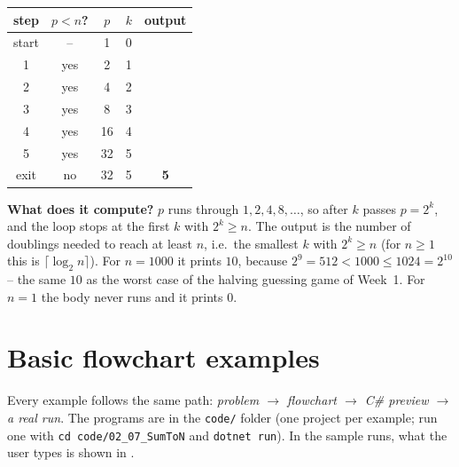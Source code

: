 \documentclass[11pt,a4paper]{article}
\begin{document}
\begin{center}
\begin{minipage}[c]{0.46\linewidth}\centering
{}
\end{minipage}\hfill
\begin{minipage}[c]{0.5\linewidth}\centering\small
\begin{tabular}{ccccc}
\toprule
step & $p<n$? & $p$ & $k$ & output\\ \midrule
start & -- & 1 & 0 & \\
1 & yes & 2 & 1 & \\
2 & yes & 4 & 2 & \\
3 & yes & 8 & 3 & \\
4 & yes & 16 & 4 & \\
5 & yes & 32 & 5 & \\
exit & \textcolor{errc}{no} & 32 & 5 & \textbf{5}\\ \bottomrule
\end{tabular}
\end{minipage}
\end{center}
\textbf{What does it compute?} $p$ runs through $1, 2, 4, 8, \dots$, so after $k$ passes $p = 2^k$, and the loop stops at the first $k$ with $2^k \ge n$. The output is the number of doublings needed to reach at least $n$, i.e.\ the smallest $k$ with $2^k \ge n$ (for $n \ge 1$ this is $\lceil \log_2 n \rceil$). For $n = 1000$ it prints $10$, because $2^9 = 512 < 1000 \le 1024 = 2^{10}$ -- the same $10$ as the worst case of the halving guessing game of Week~1. For $n = 1$ the body never runs and it prints $0$.

\section{Basic flowchart examples}\label{sec:examples}
Every example follows the same path: \emph{problem $\to$ flowchart $\to$ C\# preview $\to$ a real run}. The programs are in the \texttt{code/} folder (one project per example; run one with \texttt{cd code/02\_07\_SumToN} and \texttt{dotnet run}). In the sample runs, what the user types is shown in .
\end{document}
